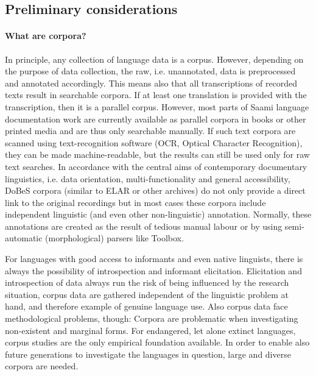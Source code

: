 \documentclass[a4paper,12pt]{article}
\begin{document}
\subsection{Preliminary considerations}%
\paragraph{What are corpora?} In principle, any collection of language data is a corpus. However, depending
on the purpose of data collection, the raw, i.e. unannotated,  data is preprocessed and annotated accordingly. This means also that all transcriptions of recorded texts result in searchable corpora. If at least one translation is provided with the transcription, then it is a parallel corpus. However, most parts of Saami language documentation work are currently available as parallel corpora in books or other printed media and are thus only searchable manually. If such text corpora are scanned using text-recognition software (OCR, Optical Character Recognition), they can be made machine-readable, but the results can still be used only for raw text searches. In accordance with the central aims of contemporary documentary linguistics, i.e. data orientation, multi-functionality and general accessibility, DoBeS corpora (similar to ELAR or other archives) do not only provide a direct link to the original recordings but in most cases these corpora include independent linguistic (and even other non-linguistic) annotation. Normally, these annotations are created as the result of tedious manual labour or by using semi-automatic (morphological) parsers like Toolbox.

For languages with good access to informants and even native linguists, there is always the possibility of introspection and informant elicitation. Elicitation and introspection of data always run the risk of being influenced by the research situation, corpus data are gathered independent of the linguistic problem at hand, and therefore example of genuine language use. Also corpus data face methodological problems, though: Corpora are problematic when investigating non-existent and marginal forms.  For endangered, let alone extinct languages, corpus studies are the only empirical foundation available. In order to enable also future generations to investigate the languages in question, large and diverse corpora are needed.
\end{document}
